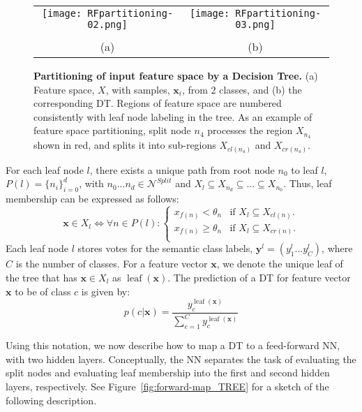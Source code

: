 \documentclass[twocolumn]{svjour3}
\DeclareMathOperator{\leaf}{leaf}
\begin{document}
\begin{figure}
\begin{center}
\begin{tabular}{cc}

   \texttt{[image: RFpartitioning-02.png]} &
   \texttt{[image: RFpartitioning-03.png]} \\ \\
				   (a) & (b)
\end{tabular}
\end{center}
   \caption{\textbf{Partitioning of input feature space by a Decision Tree.} (a) Feature space, $X$, with samples, $\mathbf{x}_i$, from 2 classes, and (b) the corresponding DT.  Regions of feature space are numbered consistently with leaf node labeling in the tree.  As an example of feature space partitioning, split node $n_4$ processes the region $X_{n_4}$ shown in red, and splits it into sub-regions $X_{cl(n_4)}$ and $X_{cr(n_4)}$.}
\label{fig:RFpartitioning}
\end{figure}


For each leaf node $l$, there exists a unique path from root node $n_0$ to leaf $l$, $P(l)=\{n_i\}_{i=0}^d$, with $n_0...n_d \in \mathcal{N}^{Split}$ and $X_l \subseteq X_{n_d} \subseteq ... \subseteq X_{n_0}$.
Thus, leaf membership can be expressed as follows:
\begin{equation}
\mathbf{x} \in X_l \Longleftrightarrow \forall n \in P(l) : \begin{cases}
x_{f(n)} < \theta_n & \text{if $X_l \subseteq X_{cl(n)}$}.\\
x_{f(n)} \geq \theta_n & \text{if $X_l \subseteq X_{cr(n)}$}.\\
\end{cases}
\label{eq:rf:leaf-membership}
\end{equation}
Each leaf node $l$ stores votes for the semantic class labels, $\mathbf{y}^l = (y^l_1...y^l_{C})$, where $C$ is the number of classes.
For a feature vector $\mathbf{x}$, we denote the unique leaf of the tree that has $\mathbf{x}\in X_l$ as $\leaf(\mathbf{x})$.
The prediction of a DT for feature vector $\mathbf{x}$ to be of class $c$ is given by:
\begin{equation}
p(c | \mathbf{x}) = \frac{y^{\leaf(\mathbf{x})}_c}{\sum_{c=1}^{C}y^{\leaf(\mathbf{x})}_c} 
\label{eq:dt:prediction}
\end{equation}

Using this notation, we now describe how to map a DT to a feed-forward NN, with two hidden layers.
Conceptually, the NN separates the task of evaluating the split nodes and evaluating leaf membership into the first and second hidden layers, respectively. 
See
Figure~\ref{fig:forward-map_TREE}
for a sketch of the following description.
\end{document}
